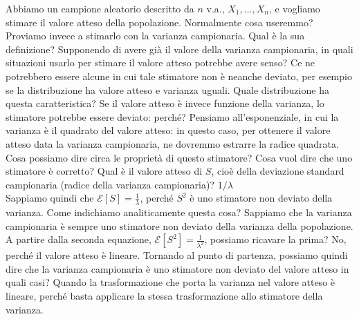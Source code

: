 \documentclass{article}
\begin{document}
    Abbiamo un campione aleatorio descritto da $ n $ v.a., $ X_1 , \dots , X_n $, e vogliamo stimare il valore atteso della popolazione. Normalmente cosa useremmo? Proviamo invece
    a stimarlo con la varianza campionaria. Qual è la sua definizione? Supponendo di avere già il valore della varianza campionaria, in quali situazioni usarlo per stimare il
    valore atteso potrebbe avere senso? Ce ne potrebbero essere alcune in cui tale stimatore non è neanche deviato, per esempio se la distribuzione ha valore atteso e varianza
    uguali. Quale distribuzione ha questa caratteristica? Se il valore atteso è invece funzione della varianza, lo stimatore potrebbe essere deviato: perché? Pensiamo
    all'esponenziale, in cui la varianza è il quadrato del valore atteso: in questo caso, per ottenere il valore atteso data la varianza campionaria, ne dovremmo estrarre la
    radice quadrata. Cosa possiamo dire circa le proprietà di questo stimatore? Cosa vuol dire che uno stimatore è corretto? Qual è il valore atteso di $ S $, cioè della deviazione
    standard campionaria (radice della varianza campionaria)? $ 1 / \lambda $ \\
    Sappiamo quindi che $ \mathcal E [ S ] = \frac{ 1 }{ \lambda } $, perché $ S^2 $ è uno stimatore non deviato della varianza. Come indichiamo analiticamente questa cosa?
    Sappiamo che la varianza campionaria è sempre uno stimatore non deviato della varianza della popolazione. A partire dalla seconda equazione,
    $ \mathcal E [ S^2 ] = \frac{ 1 }{ \lambda^2 } $, possiamo ricavare la prima? No, perché il valore atteso è lineare. Tornando al punto di partenza, possiamo quindi dire che la
    varianza campionaria è uno stimatore non deviato del valore atteso in quali casi? Quando la trasformazione che porta la varianza nel valore atteso è lineare, perché basta
    applicare la stessa trasformazione allo stimatore della varianza. \\
\end{document}
